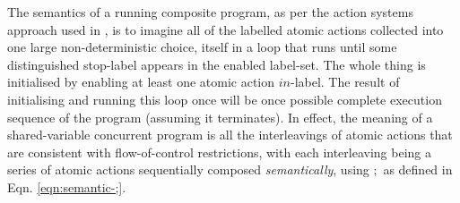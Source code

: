 The semantics of a running composite program,
as per the action systems approach used in \cite{DBLP:conf/icfem/WoodcockH02},
is to imagine all of the labelled atomic actions collected into one large
non-deterministic choice,
itself in a loop that runs until some distinguished stop-label appears
in the enabled label-set. The whole thing is initialised by enabling
at least one atomic action $in$-label.
The result of initialising and running this loop once
will be once possible complete execution sequence of the program
(assuming it terminates).
In effect, the meaning of a shared-variable concurrent program
is all the interleavings of atomic actions that are consistent
with flow-of-control restrictions, with each interleaving
being a series of atomic actions sequentially composed \emph{semantically},
using $;$ as defined in Eqn. \ref{eqn:semantic-;}.

